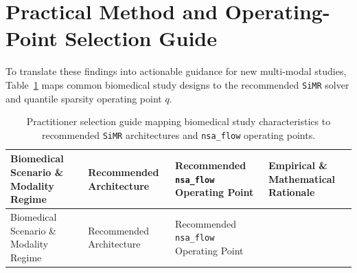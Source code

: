 \documentclass[
  10pt,
  letterpaper,
]{report}
\begin{document}
\section{Practical Method and Operating-Point Selection
Guide}\label{practical-method-and-operating-point-selection-guide}

To translate these findings into actionable guidance for new multi-modal
studies, Table~\ref{tbl-practitioner-guide} maps common biomedical study
designs to the recommended \texttt{SiMR} solver and quantile sparsity
operating point \(q\).

\begin{longtable}[]{@{}
  >{\raggedright\arraybackslash}p{}
  >{\raggedright\arraybackslash}p{}
  >{\raggedright\arraybackslash}p{}
  >{\raggedright\arraybackslash}p{}@{}}
\caption{Practitioner selection guide mapping biomedical study
characteristics to recommended \protect\texttt{SiMR} architectures and
\protect\texttt{nsa\_flow} operating
points.}\label{tbl-practitioner-guide}\tabularnewline
\toprule\noalign{}
\begin{minipage}[b]{\linewidth}\raggedright
Biomedical Scenario \& Modality Regime
\end{minipage} & \begin{minipage}[b]{\linewidth}\raggedright
Recommended Architecture
\end{minipage} & \begin{minipage}[b]{\linewidth}\raggedright
Recommended \texttt{nsa\_flow} Operating Point
\end{minipage} & \begin{minipage}[b]{\linewidth}\raggedright
Empirical \& Mathematical Rationale
\end{minipage} \\
\midrule\noalign{}
\endfirsthead
\toprule\noalign{}
\begin{minipage}[b]{\linewidth}\raggedright
Biomedical Scenario \& Modality Regime
\end{minipage} & \begin{minipage}[b]{\linewidth}\raggedright
Recommended Architecture
\end{minipage} & \begin{minipage}[b]{\linewidth}\raggedright
Recommended \texttt{nsa\_flow} Operating Point
\end{minipage} & \begin{minipage}[b]{\linewidth}\raggedright

\end{minipage}
\end{longtable}
\end{document}
